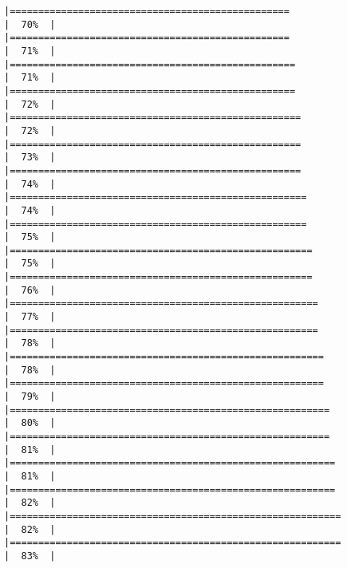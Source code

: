 \documentclass[
]{book}
\begin{document}
\begin{verbatim}
|=================================================                     |  70%  |                                                                              |=================================================                     |  71%  |                                                                              |==================================================                    |  71%  |                                                                              |==================================================                    |  72%  |                                                                              |===================================================                   |  72%  |                                                                              |===================================================                   |  73%  |                                                                              |===================================================                   |  74%  |                                                                              |====================================================                  |  74%  |                                                                              |====================================================                  |  75%  |                                                                              |=====================================================                 |  75%  |                                                                              |=====================================================                 |  76%  |                                                                              |======================================================                |  77%  |                                                                              |======================================================                |  78%  |                                                                              |=======================================================               |  78%  |                                                                              |=======================================================               |  79%  |                                                                              |========================================================              |  80%  |                                                                              |========================================================              |  81%  |                                                                              |=========================================================             |  81%  |                                                                              |=========================================================             |  82%  |                                                                              |==========================================================            |  82%  |                                                                              |==========================================================            |  83%  |                                                                              
\end{verbatim}
\end{document}
